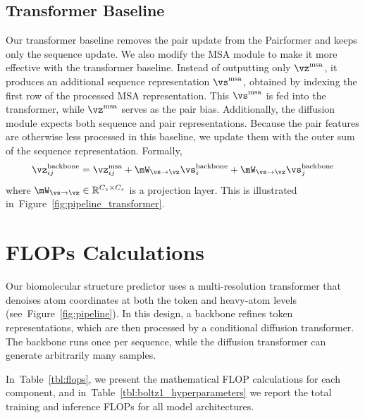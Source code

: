\documentclass{article} %
\newcommand{\reffig}[1]{Figure~\ref{fig:#1}}
\newcommand{\reftbl}[1]{Table~\ref{tbl:#1}}
\newcommand{\lblsec}[1]{\label{sec:#1}}
\begin{document}
\subsection{Transformer Baseline}
\lblsec{transformer_baseline}
Our transformer baseline removes the pair update from the Pairformer and keeps only the sequence update.
We also modify the MSA module to make it more effective with the transformer baseline.
Instead of outputting only $\vz^{\text{msa}}$, it produces an additional sequence representation $\vs^{\text{msa}}$, obtained by indexing the first row of the processed MSA representation.
This $\vs^{\text{msa}}$ is fed into the transformer, while $\vz^{\text{msa}}$ serves as the pair bias.
Additionally, the diffusion module expects both sequence and pair representations.
Because the pair features are otherwise less processed in this baseline, we update them with the outer sum of the sequence representation.
Formally,
$$
\vz^{\text{backbone}}_{ij} =  \vz^{\text{msa}}_{ij} + \mW_{\vs \rightarrow \vz} \vs^{\text{backbone}}_i + \mW_{\vs \rightarrow \vz} \vs^{\text{backbone}}_j 
$$
where $\mW_{\vs \rightarrow \vz} \in \mathbb{R}^{C_z \times C_s}$ is a projection layer.
This is illustrated in~\reffig{pipeline_transformer}.

\section{FLOPs Calculations}
\lblsec{appendix/flops}

Our biomolecular structure predictor uses a multi-resolution transformer that denoises atom coordinates at both the token and heavy-atom levels (see~\reffig{pipeline}).
In this design, a backbone refines token representations, which are then processed by a conditional diffusion transformer. The backbone runs once per sequence, while the diffusion transformer can generate arbitrarily many samples.

In~\reftbl{flops}, we present the mathematical FLOP calculations for each component, and in~\reftbl{boltz1_hyperparameters} we report the total training and inference FLOPs for all model architectures.
\end{document}
